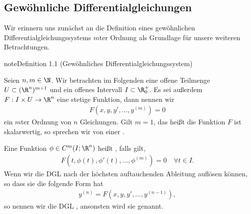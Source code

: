 \documentclass[letterpaper,10pt,english]{jupyterBook}
\begin{document}
\subsection{Gewöhnliche Differentialgleichungen}
\label{\detokenize{ode/repetition:gewohnliche-differentialgleichungen}}
Wir erinnern uns zunächst an die Definition eines gewöhnlichen Differentialgleichungssystems \(m\)\sphinxhyphen{}ter Ordnung als Grundlage für unsere weiteren Betrachtungen.
\label{ode/repetition:def:DGL}
\begin{sphinxadmonition}{note}{Definition 1.1 (Gewöhnliches Differentialgleichungssystem)}



Seien \(n,m \in \N\).
Wir betrachten im Folgenden eine offene Teilmenge \(U\subset (\R^n)^{m+1}\) und ein offenes Intervall \(I\subset\R^+_0\).
Es sei außerdem \(F:I\times U\rightarrow\R^n\) eine stetige Funktion, dann nennen wir
\begin{equation}\label{equation:ode/repetition:eq:DGL}
\begin{split}F(x,y,y',\ldots,y^{(m)}) = 0\end{split}
\end{equation}
ein  \(m\)\sphinxhyphen{}ter Ordnung von \(n\) Gleichungen.
Gilt \(m=1\), das heißt die Funktion \(F\) ist skalarwertig, so sprechen wir von einer .

Eine Funktion \(\phi\in C^m(I;\R^n)\) heißt , falls gilt,
\begin{equation*}
\begin{split}F(t, \phi(t), \phi'(t), \ldots, \phi^{(m)}) = 0 \quad \forall t\in I.\end{split}
\end{equation*}
Wenn wir die DGL nach der höchsten auftauchenden Ableitung auflösen können, so dass sie die folgende Form hat
\begin{equation*}
\begin{split}y^{(n)} = F(x,y,y',\ldots,y^{(n-1)}),\end{split}
\end{equation*}
so nennen wir die DGL , ansonsten wird sie  genannt.
\end{sphinxadmonition}
\end{document}
